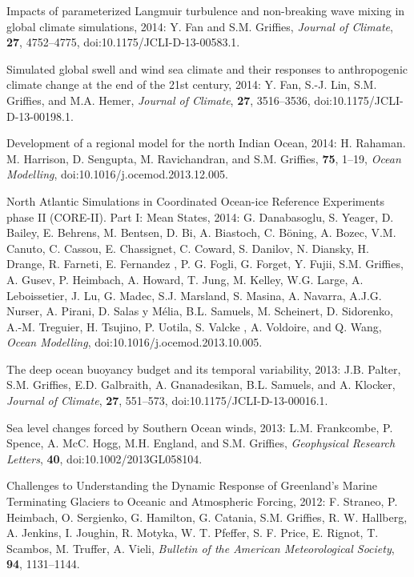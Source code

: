 \begin{etaremune}
\item Impacts of parameterized Langmuir turbulence and non-breaking wave mixing in global climate simulations, 2014: Y. Fan and S.M. Grif\/f\/ies, {\it Journal of Climate}, {\bf 27},  4752--4775, doi:10.1175/JCLI-D-13-00583.1.

\item Simulated global swell and wind sea climate and their responses to anthropogenic climate change at the end of the 21st century,
  2014: Y. Fan, S.-J. Lin, S.M. Grif\/f\/ies, and M.A. Hemer, {\it Journal of Climate}, {\bf 27}, 3516--3536, doi:10.1175/JCLI-D-13-00198.1.

\item Development of a regional model for the north Indian Ocean, 2014: H. Rahaman. M. Harrison, D. Sengupta, M.  Ravichandran, and S.M. Grif\/f\/ies, {\bf 75}, 1--19, {\it Ocean Modelling}, doi:10.1016/j.ocemod.2013.12.005.

\item North Atlantic Simulations in Coordinated Ocean-ice Reference Experiments phase II (CORE-II). Part I: Mean States, 2014: G. Danabasoglu, S. Yeager, D. Bailey, E. Behrens, M. Bentsen, D. Bi, A. Biastoch, C. {B\"{o}ning}, A. Bozec, V.M. Canuto, C. Cassou, E. Chassignet, C. Coward, S. Danilov, N. Diansky, H. Drange, R. Farneti, E. Fernandez , P. G. Fogli, G. Forget, Y. Fujii, S.M. Grif\/f\/ies, A.  Gusev, P. Heimbach, A.  Howard, T. Jung,  M. Kelley, W.G. Large, A. Leboissetier, J. Lu, G. Madec, S.J. Marsland, S. Masina, A. Navarra, A.J.G. Nurser, A. Pirani, D. Salas y {M\'{e}lia}, B.L. Samuels, M. Scheinert, D. Sidorenko, A.-M. Treguier, H. Tsujino, P.   Uotila, S. Valcke , A. Voldoire, and Q. Wang, {\it Ocean Modelling}, doi:10.1016/j.ocemod.2013.10.005.

\item The deep ocean buoyancy budget and its temporal variability,
  2013: J.B. Palter, S.M. Grif\/f\/ies, E.D. Galbraith,
  A. Gnanadesikan, B.L. Samuels, and A. Klocker, {\it Journal of
    Climate}, {\bf 27}, 551--573,
  doi:10.1175/JCLI-D-13-00016.1.

\item Sea level changes forced by Southern Ocean winds, 2013:
  L.M. Frankcombe, P. Spence, A. McC. Hogg, M.H. England, and S.M. Grif\/f\/ies, {\it Geophysical Research Letters}, {\bf 40},  doi:10.1002/2013GL058104.

\item Challenges to Understanding the Dynamic Response of Greenland's Marine Terminating Glaciers to Oceanic and Atmospheric Forcing, 2012: F. Straneo, P. Heimbach, O. Sergienko, G. Hamilton, G. Catania, S.M. Grif\/f\/ies, R. W. Hallberg, A. Jenkins, I. Joughin, R. Motyka, W. T. Pfeffer, S. F. Price, E. Rignot, T. Scambos, M. Truffer, A. Vieli, {\it Bulletin of the American Meteorological Society}, {\bf 94}, 1131--1144.


\end{etaremune}
